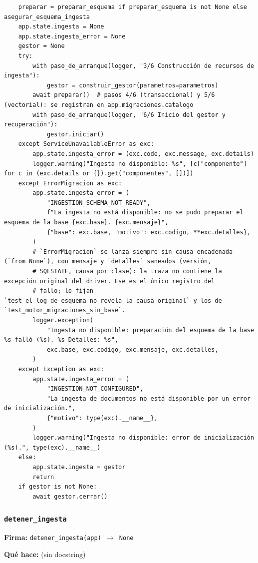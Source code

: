 \documentclass[11pt,a4paper]{article}
\begin{document}
\begin{lstlisting}
    preparar = preparar_esquema if preparar_esquema is not None else asegurar_esquema_ingesta
    app.state.ingesta = None
    app.state.ingesta_error = None
    gestor = None
    try:
        with paso_de_arranque(logger, "3/6 Construcción de recursos de ingesta"):
            gestor = construir_gestor(parametros=parametros)
        await preparar()  # pasos 4/6 (transaccional) y 5/6 (vectorial): se registran en app.migraciones.catalogo
        with paso_de_arranque(logger, "6/6 Inicio del gestor y recuperación"):
            gestor.iniciar()
    except ServiceUnavailableError as exc:
        app.state.ingesta_error = (exc.code, exc.message, exc.details)
        logger.warning("Ingesta no disponible: %s", [c["componente"] for c in (exc.details or {}).get("componentes", [])])
    except ErrorMigracion as exc:
        app.state.ingesta_error = (
            "INGESTION_SCHEMA_NOT_READY",
            f"La ingesta no está disponible: no se pudo preparar el esquema de la base {exc.base}. {exc.mensaje}",
            {"base": exc.base, "motivo": exc.codigo, **exc.detalles},
        )
        # `ErrorMigracion` se lanza siempre sin causa encadenada (`from None`), con mensaje y `detalles` saneados (versión,
        # SQLSTATE, causa por clase): la traza no contiene la excepción original del driver. Ese es el único registro del
        # fallo; lo fijan `test_el_log_de_esquema_no_revela_la_causa_original` y los de `test_motor_migraciones_sin_base`.
        logger.exception(
            "Ingesta no disponible: preparación del esquema de la base %s falló (%s). %s Detalles: %s",
            exc.base, exc.codigo, exc.mensaje, exc.detalles,
        )
    except Exception as exc:
        app.state.ingesta_error = (
            "INGESTION_NOT_CONFIGURED",
            "La ingesta de documentos no está disponible por un error de inicialización.",
            {"motivo": type(exc).__name__},
        )
        logger.warning("Ingesta no disponible: error de inicialización (%s).", type(exc).__name__)
    else:
        app.state.ingesta = gestor
        return
    if gestor is not None:
        await gestor.cerrar()
\end{lstlisting}

\subsubsection*{\texttt{detener\_ingesta}}
\textbf{Firma:} \texttt{detener\_ingesta(app) $\rightarrow$ None}

\textbf{Qué hace:} (sin docstring)
\end{document}
